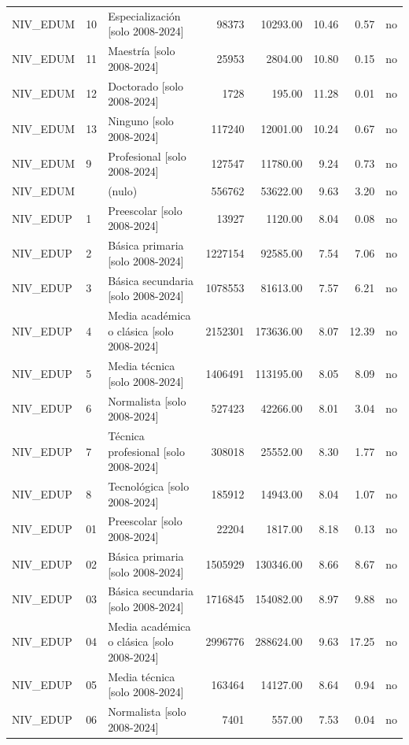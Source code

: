 \begin{tabular}{lllrrrrr}
NIV\_EDUM & 10 & Especialización  [solo 2008-2024] & 98373 & 10293.00 & 10.46 & 0.57 & no \\
NIV\_EDUM & 11 & Maestría  [solo 2008-2024] & 25953 & 2804.00 & 10.80 & 0.15 & no \\
NIV\_EDUM & 12 & Doctorado  [solo 2008-2024] & 1728 & 195.00 & 11.28 & 0.01 & no \\
NIV\_EDUM & 13 & Ninguno  [solo 2008-2024] & 117240 & 12001.00 & 10.24 & 0.67 & no \\
NIV\_EDUM & 9 & Profesional  [solo 2008-2024] & 127547 & 11780.00 & 9.24 & 0.73 & no \\
NIV\_EDUM &  & (nulo) & 556762 & 53622.00 & 9.63 & 3.20 & no \\
NIV\_EDUP & 1 & Preescolar  [solo 2008-2024] & 13927 & 1120.00 & 8.04 & 0.08 & no \\
NIV\_EDUP & 2 & Básica primaria  [solo 2008-2024] & 1227154 & 92585.00 & 7.54 & 7.06 & no \\
NIV\_EDUP & 3 & Básica secundaria  [solo 2008-2024] & 1078553 & 81613.00 & 7.57 & 6.21 & no \\
NIV\_EDUP & 4 & Media académica o clásica  [solo 2008-2024] & 2152301 & 173636.00 & 8.07 & 12.39 & no \\
NIV\_EDUP & 5 & Media técnica  [solo 2008-2024] & 1406491 & 113195.00 & 8.05 & 8.09 & no \\
NIV\_EDUP & 6 & Normalista  [solo 2008-2024] & 527423 & 42266.00 & 8.01 & 3.04 & no \\
NIV\_EDUP & 7 & Técnica profesional  [solo 2008-2024] & 308018 & 25552.00 & 8.30 & 1.77 & no \\
NIV\_EDUP & 8 & Tecnológica  [solo 2008-2024] & 185912 & 14943.00 & 8.04 & 1.07 & no \\
NIV\_EDUP & 01 & Preescolar  [solo 2008-2024] & 22204 & 1817.00 & 8.18 & 0.13 & no \\
NIV\_EDUP & 02 & Básica primaria  [solo 2008-2024] & 1505929 & 130346.00 & 8.66 & 8.67 & no \\
NIV\_EDUP & 03 & Básica secundaria  [solo 2008-2024] & 1716845 & 154082.00 & 8.97 & 9.88 & no \\
NIV\_EDUP & 04 & Media académica o clásica  [solo 2008-2024] & 2996776 & 288624.00 & 9.63 & 17.25 & no \\
NIV\_EDUP & 05 & Media técnica  [solo 2008-2024] & 163464 & 14127.00 & 8.64 & 0.94 & no \\
NIV\_EDUP & 06 & Normalista  [solo 2008-2024] & 7401 & 557.00 & 7.53 & 0.04 & no \\

\end{tabular}
